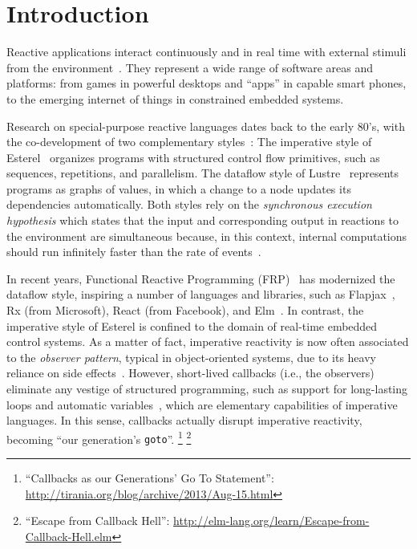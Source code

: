\documentclass{sigplanconf}
\newcommand{\code}[1] {{\small{\texttt{#1}}}}
\newcommand{\1}{\;}
\newcommand{\2}{\;\;}
\newcommand{\3}{\;\;\;}
\newcommand{\5}{\;\;\;\;\;}
\begin{document}


\section{Introduction}
\label{sec.intro}

Reactive applications interact continuously and in real time with external 
stimuli from the environment~\cite{statecharts.reactive,rp.synchronous}.
They represent a wide range of software areas and platforms: from games in 
powerful desktops and ``apps'' in capable smart phones, to the emerging 
internet of things in constrained embedded systems.

Research on special-purpose reactive languages dates back to the early 80's, 
with the co-development of two complementary 
styles~\cite{rp.twelve,rp.hypothesis}:
%
The imperative style of Esterel~\cite{esterel.ieee91} organizes programs with 
structured control flow primitives, such as sequences, repetitions, and 
parallelism.
%
The dataflow style of Lustre~\cite{lustre.ieee91} represents programs as graphs 
of values, in which a change to a node updates its dependencies automatically.
%
Both styles rely on the \emph{synchronous execution hypothesis} which states 
that the input and corresponding output in reactions to the environment are 
simultaneous because, in this context, internal computations should run 
infinitely faster than the rate of events~\cite{rp.hypothesis}.

In recent years, Functional Reactive Programming (FRP)~\cite{frp.principles} 
has modernized the dataflow style, inspiring a number of languages and 
libraries, such as Flapjax~\cite{frp.flapjax}, Rx (from Microsoft), React (from 
Facebook), and Elm~\cite{frp.elm}.
%
In contrast, the imperative style of Esterel is confined to the domain of 
real-time embedded control systems.
%
As a matter of fact, imperative reactivity is now often associated to the 
\emph{observer pattern}, typical in object-oriented systems, due to its heavy
reliance on side effects~\cite{rp.deprecating,rp.rescala,gamepatterns}.
%
However, short-lived callbacks (i.e., the observers) eliminate any vestige of 
structured programming, such as support for long-lasting loops and automatic 
variables~\cite{sync_async.cooperative}, which are elementary capabilities of 
imperative languages.
%
In this sense, callbacks actually disrupt imperative reactivity, becoming ``our 
generation's \code{goto}''.%
\footnote{``Callbacks as our Generations' Go To Statement'':
\url{http://tirania.org/blog/archive/2013/Aug-15.html}}%
\footnote{``Escape from Callback Hell'':
\url{http://elm-lang.org/learn/Escape-from-Callback-Hell.elm}}
\end{document}
